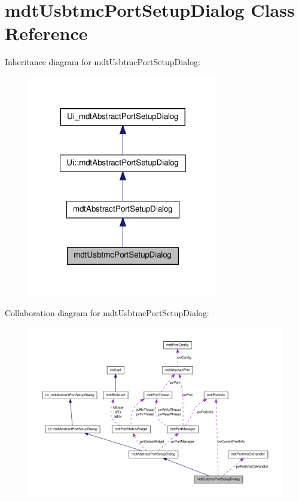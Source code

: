\hypertarget{classmdt_usbtmc_port_setup_dialog}{
\section{mdtUsbtmcPortSetupDialog Class Reference}
\label{classmdt_usbtmc_port_setup_dialog}
}


Inheritance diagram for mdtUsbtmcPortSetupDialog:\nopagebreak
\begin{figure}[H]
\begin{center}
\leavevmode
\includegraphics[width=236pt]{classmdt_usbtmc_port_setup_dialog__inherit__graph}
\end{center}
\end{figure}


Collaboration diagram for mdtUsbtmcPortSetupDialog:\nopagebreak
\begin{figure}[H]
\begin{center}
\leavevmode
\includegraphics[width=400pt]{classmdt_usbtmc_port_setup_dialog__coll__graph}
\end{center}
\end{figure}
